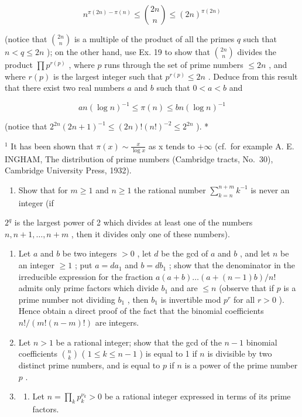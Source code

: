 \[
n ^ {\pi (2 n) - \pi (n)} \leqslant \binom {2 n} {n} \leqslant (2 n) ^ {\pi (2 n)}
\]

(notice that \(\binom{2n}{n}\) is a multiple of the product of all the primes \(q\) such that \(n < q \leqslant 2n\) ); on the other hand, use Ex. 19 to show that \(\binom{2n}{n}\) divides the product \(\prod p^{r(p)}\) , where \(p\) runs through the set of prime numbers \(\leqslant 2n\) , and where \(r(p)\) is the largest integer such that \(p^{r(p)} \leqslant 2n\) . Deduce from this result that there exist two real numbers \(a\) and \(b\) such that \(0 < a < b\) and

\[
a n (\log n) ^ {- 1} \leqslant \pi (n) \leqslant b n (\log n) ^ {- 1}
\]

(notice that \(2^{2n}(2n + 1)^{-1} \leqslant (2n)! (n!)^{-2} \leqslant 2^{2n}\) ). *

\(^{1}\) It has been shown that \(\pi(x) \sim \frac{x}{\log x}\) as x tends to \(+\infty\) (cf.~for example A. E. INGHAM, The distribution of prime numbers (Cambridge tracts, No.~30), Cambridge University Press, 1932).

\begin{enumerate}
\def\labelenumi{\arabic{enumi})}
\setcounter{enumi}{20}
\tightlist
\item
  Show that for \(m \geqslant 1\) and \(n \geqslant 1\) the rational number \(\sum_{k=n}^{n+m} k^{-1}\) is never an integer (if
\end{enumerate}

\(2^{q}\) is the largest power of 2 which divides at least one of the numbers \(n, n+1, \ldots, n+m\) , then it divides only one of these numbers).

\begin{enumerate}
\def\labelenumi{\arabic{enumi})}
\setcounter{enumi}{21}
\item
  Let \(a\) and \(b\) be two integers \(> 0\) , let \(d\) be the gcd of \(a\) and \(b\) , and let \(n\) be an integer \(\geqslant 1\) ; put \(a = da_1\) and \(b = db_1\) ; show that the denominator in the irreducible expression for the fraction \(a(a + b) \ldots (a + (n - 1)b) / n!\) admits only prime factors which divide \(b_1\) and are \(\leqslant n\) (observe that if \(p\) is a prime number not dividing \(b_1\) , then \(b_1\) is invertible mod \(p^r\) for all \(r > 0\) ). Hence obtain a direct proof of the fact that the binomial coefficients \(n! / (m!(n - m)! )\) are integers.
\item
  Let \(n > 1\) be a rational integer; show that the gcd of the \(n - 1\) binomial coefficients \(\binom{n}{k}\) ( \(1 \leqslant k \leqslant n - 1\) ) is equal to 1 if \(n\) is divisible by two distinct prime numbers, and is equal to \(p\) if \(n\) is a power of the prime number \(p\) .
\item
  \begin{enumerate}
  \def\labelenumii{\alph{enumii})}
  \tightlist
  \item
    Let \(n = \prod_{k} p_k^{\nu_k} > 0\) be a rational integer expressed in terms of its prime factors.
  \end{enumerate}
\end{enumerate}

